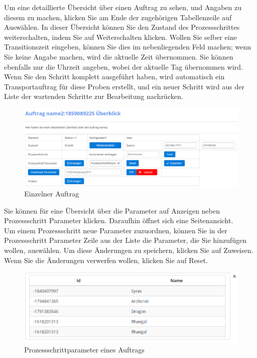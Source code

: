 \documentclass[enabledeprecatedfontcommands,fontsize=12pt,paper=a4,twoside]{scrartcl}
\begin{document}
Um eine detaillierte Übersicht über einen Auftrag zu sehen, und Angaben zu diesem zu machen, klicken Sie am Ende der zugehörigen Tabellenzeile auf Auswählen. In dieser Übersicht können Sie den Zustand des Prozessschrittes weiterschalten, indem Sie auf Weiterschalten klicken. Wollen Sie selber eine Transitionszeit eingeben, können Sie dies im nebenliegenden Feld machen; wenn Sie keine Angabe machen, wird die aktuelle Zeit übernommen. Sie können ebenfalls nur die Uhrzeit angeben, wobei der aktuelle Tag übernommen wird. \\
Wenn Sie den Schritt komplett ausgeführt haben, wird automatisch ein Transportauftrag für diese Proben erstellt, und ein neuer Schritt wird aus der Liste der wartenden Schritte zur Bearbeitung nachrücken.\\ 

\begin{figure}[h!]
\begin{center}
 \includegraphics[width=\textwidth]{screenshots/t/singleauftrag.png}
  \caption{Einzelner Auftrag}
  \label{fig:boat1}
\end{center}
\end{figure}

Sie können für eine Übersicht über die Parameter auf Anzeigen neben Prozessschritt Parameter klicken. Daraufhin öffnet sich eine Seitenansicht. \\
Um einem Prozessschritt neue Parameter zuzuordnen, können Sie in der Prozessschritt Parameter Zeile aus der Liste die Parameter, die Sie hinzufügen wollen, auswählen. Um diese Änderungen zu speichern, klicken Sie auf Zuweisen. Wenn Sie die Änderungen verwerfen wollen, klicken Sie auf Reset. \\

\begin{figure}[h!]
\begin{center}
 \includegraphics[width=\textwidth]{screenshots/t/auftragparameter.png}
  \caption{Prozessschrittparameter eines Auftrags}
  \label{fig:boat1}
\end{center}
\end{figure}
\end{document}

